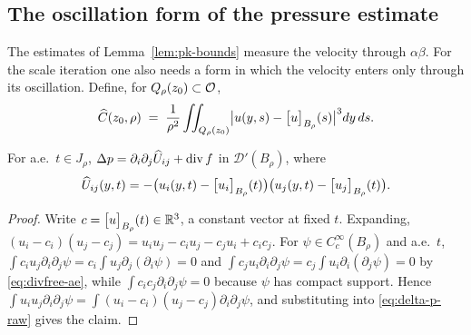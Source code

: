 \documentclass[11pt,reqno]{amsart}
\begin{document}
\subsection{The oscillation form of the pressure estimate}\label{ss:lin34}

The estimates of Lemma~\ref{lem:pk-bounds} measure the velocity through
$\alpha\beta$. For the scale iteration one also needs a form in which the
velocity enters only through its oscillation. Define, for
$Q_{\rho}(z_{0})\subset\mathcal{O}$,
\begin{equation}\label{eq:Chat}
  \widehat C(z_{0},\rho)
  \;=\;\frac1{\rho^{2}}\iint_{Q_{\rho}(z_{0})}
       \bigl|u(y,s)-\bigl[u\bigr]_{B_{\rho}}(s)\bigr|^{3}dy\,ds .
\end{equation}

\begin{lemma}\label{lem:delta-p-centred}
For a.e.\ $t\in J_{\rho}$, $\Delta p=\partial_{i}\partial_{j}\widehat U_{ij}+\operatorname{div} f$
in $\mathcal{D}'(B_{\rho})$, where
\begin{equation}\label{eq:Uhat}
  \widehat U_{ij}(y,t)
  =-\bigl(u_{i}(y,t)-\bigl[u_{i}\bigr]_{B_{\rho}}(t)\bigr)
    \bigl(u_{j}(y,t)-\bigl[u_{j}\bigr]_{B_{\rho}}(t)\bigr).
\end{equation}
\end{lemma}

\begin{proof}
Write $c=\bigl[u\bigr]_{B_{\rho}}(t)\in\mathbb{R}^{3}$, a constant vector at fixed $t$. Expanding,
$(u_{i}-c_{i})(u_{j}-c_{j})=u_{i}u_{j}-c_{i}u_{j}-c_{j}u_{i}+c_{i}c_{j}$. For
$\psi\in C_{c}^{\infty}(B_{\rho})$ and a.e.\ $t$,
$\int c_{i}u_{j}\partial_{i}\partial_{j}\psi
 =c_{i}\int u_{j}\partial_{j}(\partial_{i}\psi)=0$ and
$\int c_{j}u_{i}\partial_{i}\partial_{j}\psi
 =c_{j}\int u_{i}\partial_{i}(\partial_{j}\psi)=0$ by \eqref{eq:divfree-ae},
while $\int c_{i}c_{j}\partial_{i}\partial_{j}\psi=0$ because $\psi$ has compact
support. Hence
$\int u_{i}u_{j}\partial_{i}\partial_{j}\psi
 =\int(u_{i}-c_{i})(u_{j}-c_{j})\partial_{i}\partial_{j}\psi$, and substituting
into \eqref{eq:delta-p-raw} gives the claim.
\end{proof}
\end{document}
